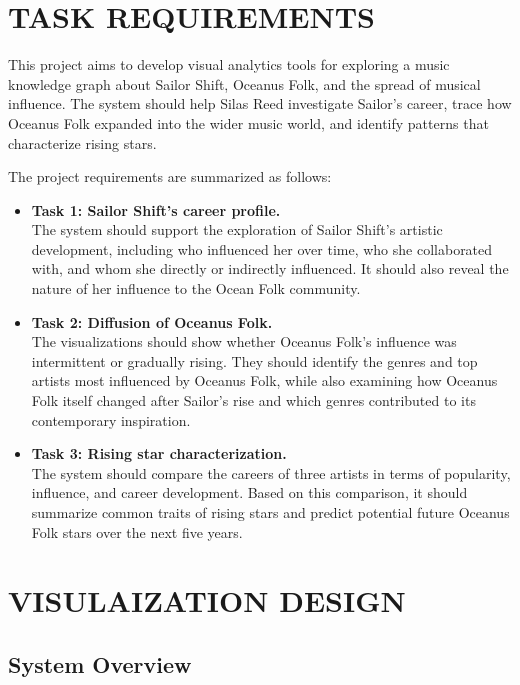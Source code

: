 \documentclass[journal]{vgtc}                     %
\begin{document}
\section{TASK REQUIREMENTS}
\label{sec:requirements}

This project aims to develop visual analytics tools for exploring a music knowledge graph about Sailor Shift, Oceanus Folk, and the spread of musical influence. The system should help Silas Reed investigate Sailor's career, trace how Oceanus Folk expanded into the wider music world, and identify patterns that characterize rising stars.

The project requirements are summarized as follows:

\begin{itemize}
    \item \textbf{Task 1: Sailor Shift's career profile.} \\
    The system should support the exploration of Sailor Shift's artistic development, including who influenced her over time, who she collaborated with, and whom she directly or indirectly influenced. It should also reveal the nature of her influence to the Ocean Folk community.

    \item \textbf{Task 2: Diffusion of Oceanus Folk.} \\
    The visualizations should show whether Oceanus Folk's influence was intermittent or gradually rising. They should identify the genres and top artists most influenced by Oceanus Folk, while also examining how Oceanus Folk itself changed after Sailor's rise and which genres contributed to its contemporary inspiration.

    \item \textbf{Task 3: Rising star characterization.} \\
    The system should compare the careers of three artists in terms of popularity, influence, and career development. Based on this comparison, it should summarize common traits of rising stars and predict potential future Oceanus Folk stars over the next five years.
\end{itemize}

\section{VISULAIZATION DESIGN}
\subsection{System Overview}
\end{document}
